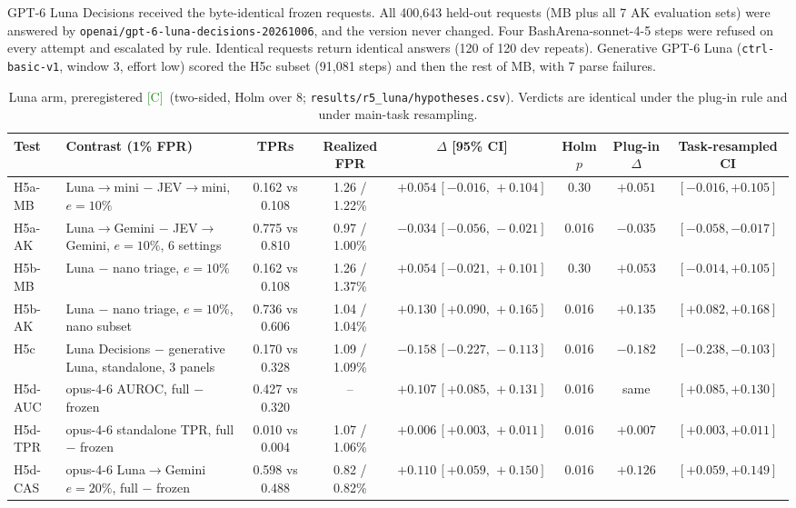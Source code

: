\documentclass[11pt]{article}
\newcommand{\tC}{\textsf{\scriptsize\textcolor{ForestGreen}{[C]}}\xspace}
\newcommand{\ci}[2]{\,[#1,\,#2]}
\begin{document}
GPT-6 Luna Decisions received the byte-identical frozen requests. All 400{,}643 held-out requests (MB plus all 7 AK evaluation sets) were answered by \texttt{openai/gpt-6-luna-decisions-20261006}, and the version never changed. Four BashArena-sonnet-4-5 steps were refused on every attempt and escalated by rule. Identical requests return identical answers (120 of 120 dev repeats). Generative GPT-6 Luna (\texttt{ctrl-basic-v1}, window 3, effort low) scored the H5c subset (91{,}081 steps) and then the rest of MB, with 7 parse failures.

\begin{table}[H]\centering\small
\begin{adjustbox}{max width=\linewidth}
\begin{tabular}{@{}llcccccc@{}}
\toprule
Test & Contrast (1\% FPR) & TPRs & Realized FPR & $\Delta$ [95\% CI] & Holm $p$ & Plug-in $\Delta$ & Task-resampled CI\\
\midrule
H5a-MB & Luna$\to$mini $-$ JEV$\to$mini, $e=10\%$ & 0.162 vs 0.108 & 1.26 / 1.22\% & $+0.054\ci{-0.016}{+0.104}$ & 0.30 & $+0.051$ & $[-0.016, +0.105]$\\
H5a-AK & Luna$\to$Gemini $-$ JEV$\to$Gemini, $e=10\%$, 6 settings & 0.775 vs 0.810 & 0.97 / 1.00\% & $\mathbf{-0.034\ci{-0.056}{-0.021}}$ & 0.016 & $-0.035$ & $[-0.058, -0.017]$\\
H5b-MB & Luna $-$ nano triage, $e=10\%$ & 0.162 vs 0.108 & 1.26 / 1.37\% & $+0.054\ci{-0.021}{+0.101}$ & 0.30 & $+0.053$ & $[-0.014, +0.105]$\\
H5b-AK & Luna $-$ nano triage, $e=10\%$, nano subset & 0.736 vs 0.606 & 1.04 / 1.04\% & $\mathbf{+0.130\ci{+0.090}{+0.165}}$ & 0.016 & $+0.135$ & $[+0.082, +0.168]$\\
H5c & Luna Decisions $-$ generative Luna, standalone, 3 panels & 0.170 vs 0.328 & 1.09 / 1.09\% & $\mathbf{-0.158\ci{-0.227}{-0.113}}$ & 0.016 & $-0.182$ & $[-0.238, -0.103]$\\
H5d-AUC & opus-4-6 AUROC, full $-$ frozen & 0.427 vs 0.320 & -- & $\mathbf{+0.107\ci{+0.085}{+0.131}}$ & 0.016 & same & $[+0.085, +0.130]$\\
H5d-TPR & opus-4-6 standalone TPR, full $-$ frozen & 0.010 vs 0.004 & 1.07 / 1.06\% & $\mathbf{+0.006\ci{+0.003}{+0.011}}$ & 0.016 & $+0.007$ & $[+0.003, +0.011]$\\
H5d-CAS & opus-4-6 Luna$\to$Gemini $e=20\%$, full $-$ frozen & 0.598 vs 0.488 & 0.82 / 0.82\% & $\mathbf{+0.110\ci{+0.059}{+0.150}}$ & 0.016 & $+0.126$ & $[+0.059, +0.149]$\\
\bottomrule
\end{tabular}
\end{adjustbox}
\caption{Luna arm, preregistered \tC\ (two-sided, Holm over 8; \nolinkurl{results/r5_luna/hypotheses.csv}). Verdicts are identical under the plug-in rule and under main-task resampling.}\label{tab:luna}
\end{table}
\end{document}
